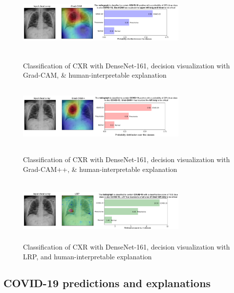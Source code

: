 \documentclass[conference]{IEEEtran}
\begin{document}
\begin{figure}
	\centering
    	\includegraphics[width=0.75\textwidth,height=32mm]{samples/gradcam_1.png}
    	\caption{Classification of CXR with DenseNet-161, decision visualization with Grad-CAM, \& human-interpretable explanation}
    	\label{Fig:ggcam_viz}
    	\smallskip
    	\includegraphics[width=0.75\textwidth,height=32mm]{samples/gradcam++_1.png}
    	\caption{Classification of CXR with DenseNet-161, decision visualization with Grad-CAM++, \& human-interpretable explanation}
    	\label{Fig:ggcam_plus_viz}
    	\smallskip
    	\includegraphics[width=0.75\textwidth,height=32mm]{samples/lrp1.png}
    	\caption{Classification of CXR with DenseNet-161, decision visualization with LRP, and human-interpretable explanation}
    	\label{Fig:lrp_viz}
    	\vspace{-2mm}
\end{figure}

\subsection{COVID-19 predictions and explanations}
\label{sub:expl}
\end{document}
